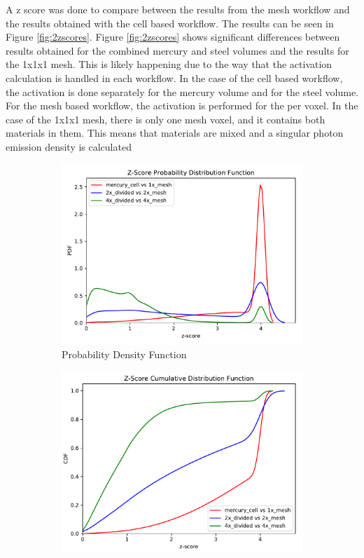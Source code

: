 A z score was done to compare between the results from the mesh workflow and the results
obtained with the cell based workflow. The results can be seen in Figure \ref{fig:2zscores}.
Figure \ref{fig:2zscores} shows significant differences between results obtained
for the combined mercury and steel volumes and the results for the 1x1x1 mesh. This is
likely happening due to the way that the activation calculation is handled in each
workflow. In the case of the cell based workflow, the activation is done separately
for the mercury volume and for the steel volume. For the mesh based workflow, the
activation is performed for the per voxel. In the case of the 1x1x1 mesh, there
is only one mesh voxel, and it contains both materials in them. This means that
materials are mixed and a singular photon emission density is calculated
%
\begin{figure}[H]
	\begin{subfigure}[h]{1.0\textwidth}
		\centering
		\includegraphics[scale=0.85, trim={0cm 0cm 0cm 0.9cm},clip]{../figs/toy_p2/PDF_zscore_VPII_all.pdf}
		\caption{Probability Density Function}
		\label{fig:2VPII_pdf}
	\end{subfigure}
	\begin{subfigure}[h]{1.0\textwidth}
		\centering
		\includegraphics[scale=0.85, trim={0cm 0cm 0cm 0.8cm},clip]{../figs/toy_p2/CDF_zscore_VPII_all.pdf}

\end{subfigure}
\end{figure}
